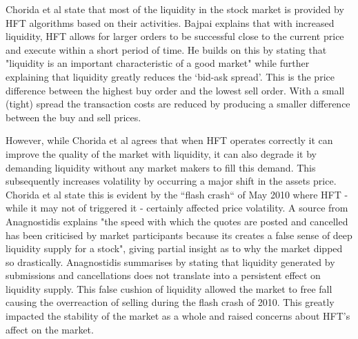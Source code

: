 \bigskip
\noindent Chorida et al \cite{REPORT:ChordiaEtAl:2013} state that most of the liquidity in the stock market is provided by HFT algorithms based on their activities. Bajpai \cite{WEB:Bajpai:0001} explains that with increased liquidity, HFT allows for larger orders to be successful close to the current price and execute within a short period of time. He builds on this by stating that "liquidity is an important characteristic of a good market" while further explaining that liquidity greatly reduces the `bid-ask spread'. This is the price difference between the highest buy order and the lowest sell order. With a small (tight) spread the transaction costs are reduced by producing a smaller difference between the buy and sell prices. 

However, while Chorida et al \cite{REPORT:ChordiaEtAl:2013} agrees that when HFT operates correctly it can improve the quality of the market with liquidity, it can also degrade it by demanding liquidity without any market makers to fill this demand. This subsequently increases volatility by occurring a major shift in the assets price. Chorida et al state this is evident by the ``flash crash`` of May 2010 where HFT - while it may not of triggered it - certainly affected price volatility. A source from Anagnostidis \cite{UNPUB:Anagnostidis:2017} explains "the speed with which the quotes are posted and cancelled has been criticised by market participants because its creates a false sense of deep liquidity supply for a stock", giving partial insight as to why the market dipped so drastically. Anagnostidis summarises by stating that liquidity generated by submissions and cancellations does not translate into a persistent effect on liquidity supply. This false cushion of liquidity allowed the market to free fall causing the overreaction of selling during the flash crash of 2010. This greatly impacted the stability of the market as a whole and raised concerns about HFT's affect on the market.   

